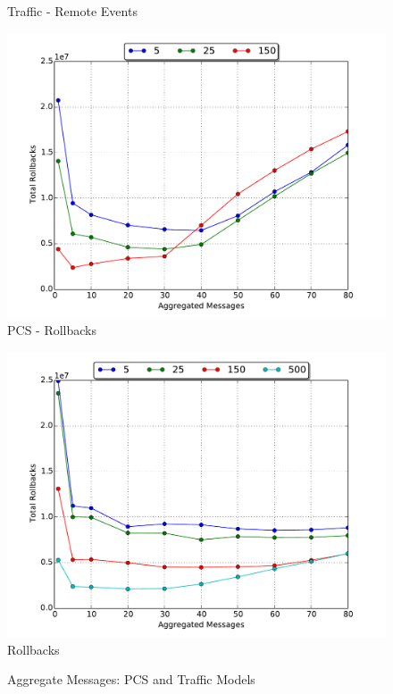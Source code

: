 \documentclass[11pt]{book}
\begin{document}
\begin{figure}
\begin{minipage}{.5\textwidth}
\begin{center}
      Traffic - Remote Events \\
    \end{center}
  \end{minipage}
  \begin{minipage}{.5\textwidth}
    \begin{center}
      \includegraphics[width=\textwidth,keepaspectratio,quiet]{figs/partitioning_communication/aggregate_pcs_rollbacks.pdf} \\
      PCS - Rollbacks \\
    \end{center}
  \end{minipage}%
  \hfill
  \begin{minipage}{.5\textwidth}
    \begin{center}
      \includegraphics[width=\textwidth,keepaspectratio,quiet]{figs/partitioning_communication/aggregate_traffic_rollbacks.pdf} \\
      Rollbacks \\
    \end{center}
  \end{minipage}
  \caption{Aggregate Messages: PCS and Traffic Models}\label{aggregate_pcs_traffic}
\end{figure}
\end{document}
